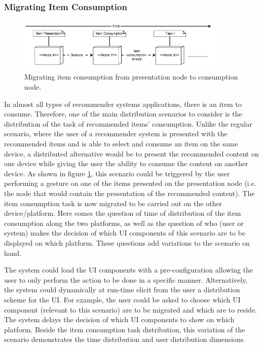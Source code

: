 \subsubsection{Migrating Item Consumption}
\begin{figure}[!htpb]
\includegraphics[width=0.9\textwidth, center, center]{figures/generic1}
\caption{Migrating item consumption from presentation node to consumption node.}
\label{fig:figure31}
\end{figure}                    
In almost all types of recommender systems applications, there is an item to
consume. Therefore, one of the main distribution scenarios to consider is the
distribution of the task of recommended items' consumption. Unlike the regular
scenario, where the user of a recommender system is presented with the
recommended items and is able to select and consume an item on the same device,
a distributed alternative would be to present the recommended content on one
device while giving the user the ability to consume the content on another device. As shown in figure \ref{fig:figure31}, this scenario could be triggered by the user performing a gesture on one of the items presented on the presentation node (i.e. the node that would contain the presentation of the recommended content). The item consumption task is now migrated to be carried out on the other device/platform.
Here comes the question of time of distribution of the item consumption along the two platforms, as well as the question of who (user or system) makes the decision of which UI components of this scenario are to be displayed on which platform. These questions add variations to the scenario on hand.\par
The system could load the UI components with a pre-configuration allowing the user to only perform the action to be done in a specific manner. Alternatively, the system could dynamically at run-time elicit from the user a distribution scheme for the UI. For example, the user could be asked to choose which UI component (relevant to this scenario) are to be migrated and which are to reside. The system delays the decision of which UI components to show on which platform. Beside the item consumption task distribution, this variation of the scenario demonstrates the time distribution and user distribution dimensions.
      
